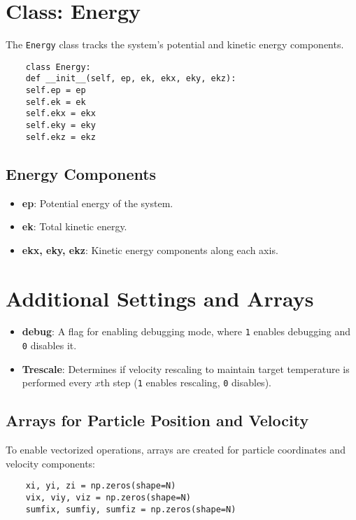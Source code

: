 \documentclass[12pt, ngerman]{report}
\begin{document}
\section{Class: Energy}
\label{sec:class_energy}

The \texttt{Energy} class tracks the system's potential and kinetic energy components.

\begin{verbatim}
	class Energy:
	def __init__(self, ep, ek, ekx, eky, ekz):
	self.ep = ep
	self.ek = ek
	self.ekx = ekx
	self.eky = eky
	self.ekz = ekz
\end{verbatim}

\subsection*{Energy Components}

\begin{itemize}
	\item \textbf{ep}: Potential energy of the system.
	\item \textbf{ek}: Total kinetic energy.
	\item \textbf{ekx, eky, ekz}: Kinetic energy components along each axis.
\end{itemize}

\section{Additional Settings and Arrays}
\label{sec:additional_settings}

\begin{itemize}
	\item \textbf{debug}: A flag for enabling debugging mode, where \texttt{1} enables debugging and \texttt{0} disables it.
	\item \textbf{Trescale}: Determines if velocity rescaling to maintain target temperature is performed every \(x\)th step (\texttt{1} enables rescaling, \texttt{0} disables).
\end{itemize}

\subsection*{Arrays for Particle Position and Velocity}

To enable vectorized operations, arrays are created for particle coordinates and velocity components:

\begin{verbatim}
	xi, yi, zi = np.zeros(shape=N)
	vix, viy, viz = np.zeros(shape=N)
	sumfix, sumfiy, sumfiz = np.zeros(shape=N)
\end{verbatim}
\end{document}
